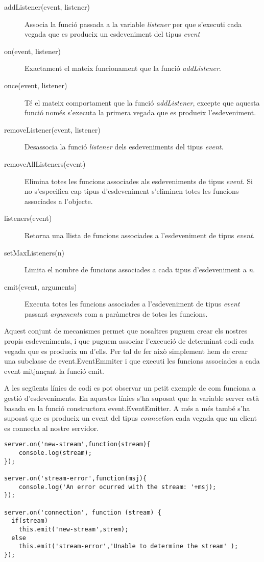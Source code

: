 \begin{description}
    \item[addListener(event, listener)]{ Associa la funció passada a la variable \emph{listener} per que s'executi cada vegada que es produeix un esdeveniment del tipus \emph{event}}
    \item[on(event, listener)] { Exactament el mateix funcionament que la funció \emph{addListener}.}
    \item[once(event, listener)] {Té el mateix comportament que la funció \emph{addListener}, excepte que aquesta funció només s'executa la primera vegada que es produeix l'esdeveniment.}
    \item[removeListener(event, listener)]{ Desassocia la funció \emph{listener} dels esdeveniments del tipus \emph{event}.}
    \item[removeAllListeners(event)] {Elimina totes les funcions associades als esdeveniments de tipus \emph{event}. Si no s'especifica cap tipus d'esdeveniment s'eliminen totes les funcions associades a l'objecte.}
    \item[listeners(event)] { Retorna una llista de funcions associades a l'esdeveniment de tipus \emph{event}.}
    \item[setMaxListeners(n)] {Limita el nombre de funcions associades a cada tipus d'esdeveniment a \emph{n}.}
    \item[emit(event, arguments)] { Executa totes les funcions associades a l'esdeveniment de tipus \emph{event} passant \emph{arguments} com a paràmetres de totes les funcions.}
\end{description}

Aquest conjunt de mecanismes permet que nosaltres puguem crear els nostres propis esdeveniments, i que puguem associar l'execució de determinat codi cada vegada que es produeix un d'ells. Per tal de fer això simplement hem de crear una subclasse de event.EventEmmiter i que executi les funcions associades a cada event mitjançant la funció emit. 

A les següents línies de codi es pot observar un petit exemple de com funciona a gestió d'esdeveniments. En aquestes línies s'ha suposat que la variable server està basada en la funció constructora event.EventEmitter. A més a més també s'ha suposat que es produeix un event del tipus \emph{connection} cada vegada que un client es connecta al nostre servidor. 

\begin{lstlisting}
server.on('new-stream',function(stream){
    console.log(stream);
});

server.on('stream-error',function(msj){
    console.log('An error ocurred with the stream: '+msj);
});

server.on('connection', function (stream) {
  if(stream) 
    this.emit('new-stream',strem);
  else
    this.emit('stream-error','Unable to determine the stream' );
});
\end{lstlisting}

